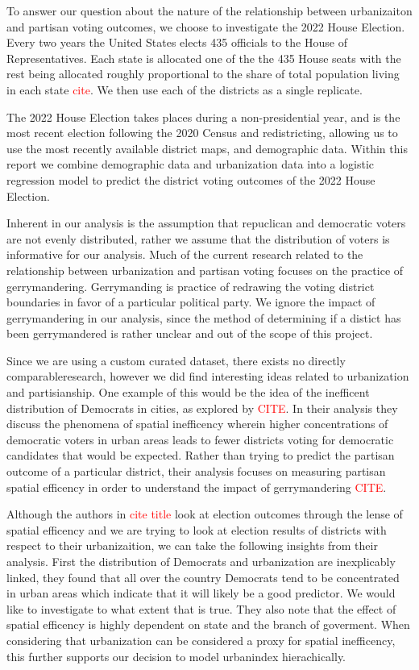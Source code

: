 \documentclass[12pt]{article}
\newcommand{\red}[1]{\textcolor{red}{#1}}
\begin{document}
To answer our question about the nature of the relationship between urbanizaiton and partisan voting outcomes, we choose to investigate the 2022 House Election. Every two years the United States elects 435 officials to the House of Representatives. Each state is allocated one of the the 435 House seats with the rest being allocated roughly proportional to the share of total population living in each state \red{cite}. We then use each of the districts as a single replicate. 

The 2022 House Election takes places during a non-presidential year, and is the most recent election following the 2020 Census and redistricting, allowing us to use the most recently available district maps, and demographic data. Within this report we combine demographic data and urbanization data into a logistic regression model to predict the district voting outcomes of the 2022 House Election. 


Inherent in our analysis is the assumption that repuclican and democratic voters are not evenly distributed, rather we assume that the distribution of voters is informative for our analysis. Much of the current research related to the relationship between urbanization and partisan voting focuses on the practice of gerrymandering. Gerrymanding is practice of redrawing the voting district boundaries in favor of a particular political party. We ignore the impact of gerrymandering in our analysis, since the method of determining if a distict has been gerrymandered is rather unclear and out of the scope of this project.

Since we are using a custom curated dataset, there exists no directly comparableresearch, however we did find interesting ideas related to urbanization and partisianship. One example of this would be the idea of the inefficent distribution of Democrats in cities, as explored by \textcolor{red}{CITE}. In their analysis they discuss the phenomena of spatial inefficency wherein higher concentrations of democratic voters in urban areas leads to fewer districts voting for democratic candidates that would be expected. Rather than trying to predict the partisan outcome of a particular district, their analysis focuses on measuring partisan spatial efficency in order to understand the impact of gerrymandering \red{CITE}. 

Although the authors in \red{cite title} look at election outcomes through the lense of spatial efficency and we are trying to look at election results of districts with respect to their urbanizaition, we can take the following insights from their analysis. First the distribution of Democrats and urbanization are inexplicably linked, they found that all over the country Democrats tend to be concentrated in urban areas which indicate that it will likely be a good predictor. We would like to investigate to what extent that is true. They also note that the effect of spatial efficency is highly dependent on state and the branch of goverment. When considering that urbanization can be considered a proxy for spatial inefficency, this further supports our decision to model urbanindex hierachically. 
\end{document}
